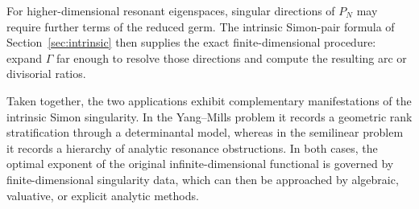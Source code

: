 \documentclass[11pt]{article}
\theoremstyle{definition}
\theoremstyle{remark}
\begin{document}
For higher-dimensional resonant eigenspaces, singular directions of $P_N$ may require further terms of the reduced germ. The intrinsic Simon-pair formula of Section~\ref{sec:intrinsic} then supplies the exact finite-dimensional procedure: expand $\Gamma$ far enough to resolve those directions and compute the resulting arc or divisorial ratios.

Taken together, the two applications exhibit complementary manifestations of the intrinsic Simon singularity. In the Yang--Mills problem it records a geometric rank stratification through a determinantal model, whereas in the semilinear problem it records a hierarchy of analytic resonance obstructions. In both cases, the optimal exponent of the original infinite-dimensional functional is governed by finite-dimensional singularity data, which can then be approached by algebraic, valuative, or explicit analytic methods.
\end{document}
